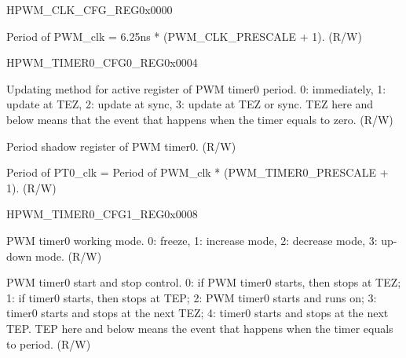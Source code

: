 
\begin{register}{H}{PWM\_CLK\_CFG\_REG}{0x0000}\label{regdesc:PWMCLKCFGREG}
%
%
\regnewline%
\begin{regdesc}\begin{reglist}
\item [PWM\_CLK\_PRESCALE]Period of PWM\_clk = 6.25ns * (PWM\_CLK\_PRESCALE + 1). (R/W)
\end{reglist}\end{regdesc}
\end{register}

\begin{register}{H}{PWM\_TIMER0\_CFG0\_REG}{0x0004}\label{regdesc:PWMTIMER0CFG0REG}
%
%
%
%
\regnewline%
\begin{regdesc}\begin{reglist}
\item [PWM\_TIMER0\_PERIOD\_UPMETHOD]Updating method for active register of PWM timer0 period. 0: immediately, 1: update at TEZ, 2: update at sync, 3: update at TEZ or sync. TEZ here and below means that the event that happens when the timer equals to zero. (R/W)
\label{regdesc:PWMTIMER0PERIOD}\item [PWM\_TIMER0\_PERIOD]Period shadow register of PWM timer0. (R/W)
\item [PWM\_TIMER0\_PRESCALE]Period of PT0\_clk = Period of PWM\_clk * (PWM\_TIMER0\_PRESCALE + 1). (R/W)
\end{reglist}\end{regdesc}
\end{register}

\begin{register}{H}{PWM\_TIMER0\_CFG1\_REG}{0x0008}\label{regdesc:PWMTIMER0CFG1REG}
%
%
%
\regnewline%
\begin{regdesc}\begin{reglist}
\item [PWM\_TIMER0\_MOD]PWM timer0 working mode. 0: freeze, 1: increase mode, 2: decrease mode, 3: up-down mode. (R/W)
\item [PWM\_TIMER0\_START]PWM timer0 start and stop control. 0: if PWM timer0 starts, then stops at TEZ; 1: if timer0 starts, then stops at TEP; 2: PWM timer0 starts and runs on; 3: timer0 starts and stops at the next TEZ; 4: timer0 starts and stops at the next TEP. TEP here and below means the event that happens when the timer equals to period. (R/W)
\end{reglist}\end{regdesc}
\end{register}


